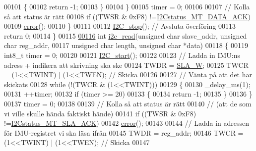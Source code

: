 \begin{DoxyCode}
00101             \{
00102                 \textcolor{keywordflow}{return} -1;
00103             \}
00104         \}                   
00105         timer = 0;
00106 
00107         \textcolor{comment}{// Kolla så att status är rätt}
00108         \textcolor{keywordflow}{if} ((TWSR & 0xF8) !=\hyperlink{_i2_c_8h_a083e480a49a539cd4740d0e1a15216f3}{I2Cstatus\_MT\_DATA\_ACK}) 
00109         \hyperlink{_i2_c_8c_ad1a5ba420409525ff5ab1be86ac5e526}{error}();
00110     \}
00111 
00112     \hyperlink{_i2_c_8c_af8dcc1bcb3e1c6c0fcdca4cf599a239b}{I2C\_stop}();         \textcolor{comment}{// Avsluta överföring}
00113     \textcolor{keywordflow}{return} 0;
00114 \}
00115 
\hypertarget{_i2_c_8c_source.tex_l00116}{}\hyperlink{_i2_c_8h_ac2d47e7a6c76f93f9b537c31a2986e7b}{00116} \textcolor{keywordtype}{int} \hyperlink{_i2_c_8c_ac2d47e7a6c76f93f9b537c31a2986e7b}{i2c\_read}(\textcolor{keywordtype}{unsigned} \textcolor{keywordtype}{char} slave\_addr, \textcolor{keywordtype}{unsigned} \textcolor{keywordtype}{char} reg\_addr,
00117              \textcolor{keywordtype}{unsigned} \textcolor{keywordtype}{char} length, \textcolor{keywordtype}{unsigned} \textcolor{keywordtype}{char} *data)
00118 \{
00119     int8\_t timer = 0;
00120 
00121     \hyperlink{_i2_c_8c_a263c74ce484e3680c05a9118707fadb7}{I2C\_start}();
00122 
00123     \textcolor{comment}{// Ladda in IMU:ns adress + indikera att skrivning ska ske}
00124     TWDR = \hyperlink{_i2_c_8h_a3df22e1e7b66be8b74b33ce077824292}{SLA\_W};                                  
00125     TWCR = (1<<TWINT) | (1<<TWEN);      \textcolor{comment}{// Skicka}
00126 
00127     \textcolor{comment}{// Vänta på att det har skickats}
00128     \textcolor{keywordflow}{while} (!(TWCR & (1<<TWINT)))
00129     \{
00130         \_delay\_ms(1);
00131         ++timer;
00132         \textcolor{keywordflow}{if} (timer >= 20)
00133         \{
00134             \textcolor{keywordflow}{return} -1;
00135         \}
00136     \}                   
00137     timer = 0;
00138 
00139     \textcolor{comment}{// Kolla så att status är rätt }
00140     \textcolor{comment}{// (att de som vi ville skulle hända faktiskt hände)}
00141     \textcolor{keywordflow}{if} ((TWSR & 0xF8) !=\hyperlink{_i2_c_8h_a86ef56020aa435f9af57015ee220c3e4}{I2Cstatus\_MT\_SLA\_ACK})       
00142     \hyperlink{_i2_c_8c_ad1a5ba420409525ff5ab1be86ac5e526}{error}();
00143 
00144     \textcolor{comment}{// Ladda in adressen för IMU-registret vi ska läsa ifrån}
00145     TWDR = reg\_addr;                                
00146     TWCR = (1<<TWINT) | (1<<TWEN);      \textcolor{comment}{// Skicka}
00147 

\end{DoxyCode}
